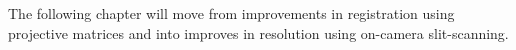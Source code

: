 The following chapter will move from improvements in registration using projective matrices and into improves in resolution using on-camera slit-scanning.

